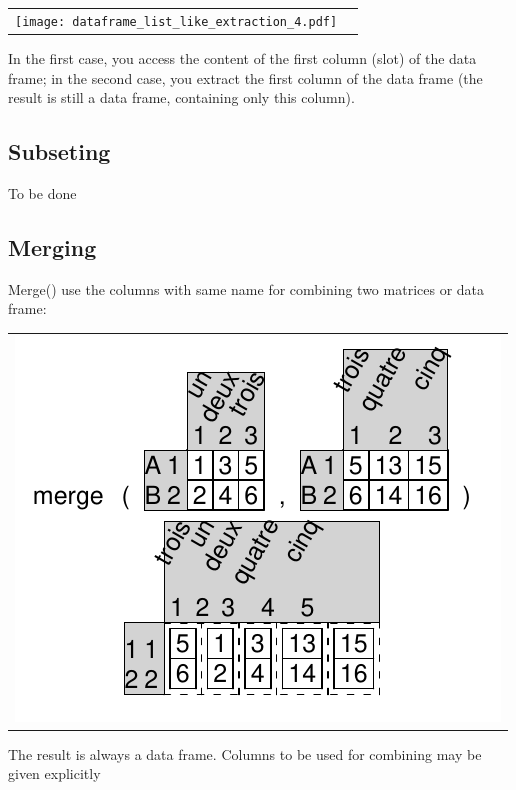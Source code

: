 \documentclass[pdflatex]{article}
\begin{document}
\begin{tabular}{cc}
\texttt{[image: dataframe\_list\_like\_extraction\_4.pdf]}
\end{tabular}

In the first case, you access the content of the first column (slot) of the
data frame; in the second case, you extract the first column of the data frame
(the result is still a data frame, containing only this column).

\subsection{Subseting}

To be done


% 

\subsection{Merging}

Merge() use the columns with same name for combining two matrices or data frame:

\begin{tabular}{c}
\includegraphics{merge.pdf}
\end{tabular}

The result is always a data frame. Columns to be used for combining may be
given explicitly
\end{document}
